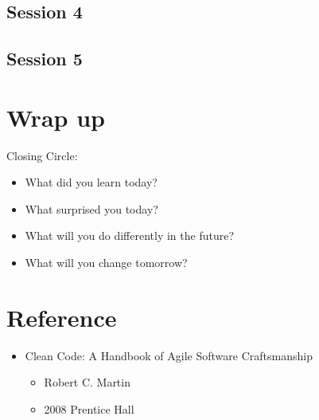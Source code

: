 \documentclass[12pt, xcolor=table, dvipsnames]{beamer}
\begin{document}
\subsection{Session 4}
\begin{frame}[squeeze]{\subsecname{}}
\end{frame}

\subsection{Session 5}




\section{Wrap up}
\begin{frame}{\secname{} }
Closing Circle:
    \begin{itemize}[<*>]
		\item What did you learn today?
		\item What surprised you today?
		\item What will you do differently in the future?
		\item What will you change tomorrow? 
    \end{itemize}
\end{frame}

\section{Reference}
\begin{frame}{\secname{}}
    \begin{itemize}[<*>]
        \item Clean Code: A Handbook of Agile Software Craftsmanship
        \begin{itemize}[<*>] 
        \item Robert C. Martin
        \item 2008 Prentice Hall
        \end{itemize} 
     \end{itemize}
\end{frame}
\end{document}
